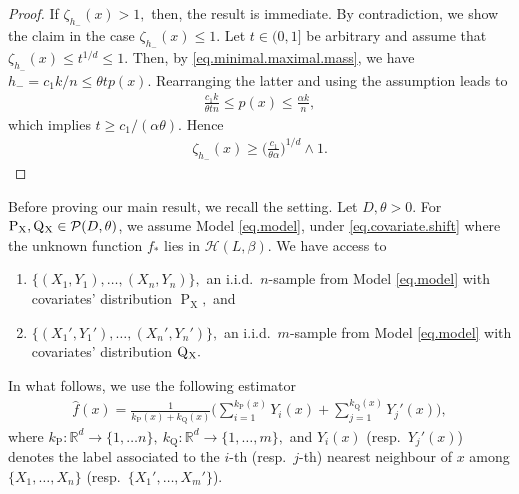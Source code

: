 \documentclass[10pt]{article}
\newcommand{\mH}{\mathcal{H}}
\newcommand{\mP}{\mathcal{P}}
\newcommand{\RR}{\mathbb{R}}
\renewcommand{\P}{\operatorname{P}}
\newcommand{\Q}{\operatorname{Q}}
\newcommand{\wh}{\widehat}
\newcommand{\sX}{\mathrm{X}}
\begin{document}
\begin{proof}
    If $\zeta_{h_-}(x) > 1,$ then, the result is immediate. By contradiction, we show the claim in the case $\zeta_{h_-}(x) \leq 1$. Let $t \in (0, 1]$ be arbitrary and assume that $\zeta_{h_-}(x) \leq t^{1/d} \leq 1.$ Then, by \eqref{eq.minimal.maximal.mass}, we have $h_- = c_1 k/n \leq \theta tp(x).$ Rearranging the latter and using the assumption leads to
    \begin{align*}
        \frac{c_1 k}{\theta t n} \leq p(x) \leq \frac{\alpha k}n,
    \end{align*}
    which implies $t \geq c_1/(\alpha \theta).$ Hence
    \begin{align*}
         \zeta_{h_-}(x) \geq \bigg(\frac{c_1}{\theta\alpha}\bigg)^{1/d} \wedge 1.
    \end{align*}
\end{proof}

Before proving our main result, we recall the setting. Let $D, \theta > 0.$ For $\P_{\sX}, \Q\mathstrut_{\!\sX} \in \mP(D, \theta)$, we assume Model \eqref{eq.model}, under \eqref{eq.covariate.shift} where the unknown function $f_*$ lies in $\mH(L, \beta).$ We have access to
\begin{enumerate}
    \item $\{(X_1, Y_1), \dots, (X_n, Y_n)\},$ an i.i.d.\ $n$-sample from Model \eqref{eq.model} with covariates' distribution $\P_{\sX},$ and
    \item $\{(X_1', Y_1'), \dots, (X_n', Y_n')\},$ an i.i.d.\ $m$-sample from Model \eqref{eq.model} with covariates' distribution $\Q\mathstrut_{\!\sX}.$
\end{enumerate}
In what follows, we use the following estimator
\begin{align}
    \label{eq.two.sample.local.knn.appendix}
    \wh f(x) = \frac{1}{k_{\P}(x) + k_{\Q}(x)}\bigg(\sum_{i=1}^{k_{\P}(x)} Y_i(x) + \sum_{j=1}^{k_{\Q}(x)}Y_j'(x)\bigg),
\end{align}
where $k_{\P} \colon \RR^d \to \{1, \dots n\}, \ k_{\Q} \colon \RR^d \to \{1, \dots, m\},$ and $Y_i(x)$ (resp.\ $Y_j'(x)$) denotes the label associated to the $i$-th (resp.\ $j$-th) nearest neighbour of $x$ among $\{X_1, \dots, X_n\}$ (resp.\ $\{X_1', \dots, X_m'\}$).
\end{document}
